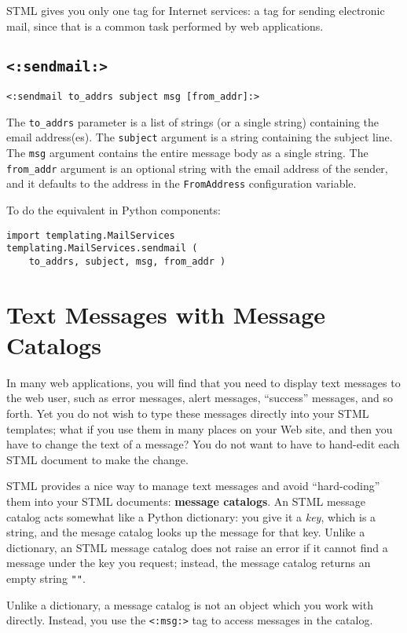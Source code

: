 \documentclass{manual}
\begin{document}
STML gives you only one tag for Internet services:
a tag for sending electronic mail, since that is
a common task performed by web applications.

\section{\texttt{<:sendmail:>}}
\label{tagsendmail}
\texttt{<:sendmail to_addrs subject msg [from_addr]:>}

The \texttt{to_addrs} parameter is a list of strings 
(or a single string) containing the email address(es). The
\texttt{subject} argument is a 
string containing the subject line. The \texttt{msg} argument contains
the entire message body as a single string. The \texttt{from_addr} argument
is an optional string with the email address of the sender, 
and it defaults to the address in the
\texttt{FromAddress} configuration variable.


To do the equivalent in Python components:
\begin{verbatim}
import templating.MailServices
templating.MailServices.sendmail ( 
    to_addrs, subject, msg, from_addr )
\end{verbatim}


\chapter{Text Messages with Message Catalogs}
\label{stmlrefmsg}
In many web applications, you will find that you need
to display text messages to the web user, such as 
error messages, alert messages, ``success'' messages,
and so forth. Yet you do not wish to type these messages
directly into your STML templates; what if you use them
in many places on your Web site, and then you have to
change the text of a message? You do not want to have
to hand-edit each STML document to make the change.

STML provides a nice way to manage text messages
and avoid ``hard-coding'' them into your STML documents:
\textbf{message catalogs}. An STML message catalog acts somewhat
like a Python dictionary: you give it a \emph{key},
which is a string, and the mesage catalog looks up
the message for that key. Unlike a dictionary, an STML
message catalog does not raise an error if it cannot
find a message under the key you request; instead,
the message catalog returns an empty string \texttt{""}.

Unlike a dictionary, a message catalog is not an object
which you work with directly. Instead,
you use the \texttt{<:msg:>} tag to access messages
in the catalog.
\end{document}
